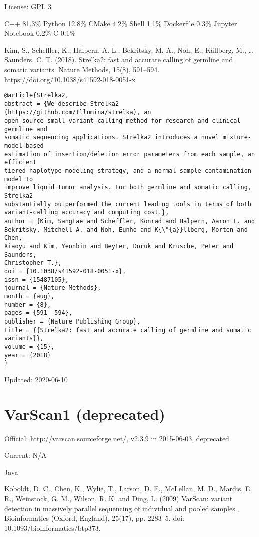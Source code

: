 \documentclass[]{article}
\begin{document}
License: GPL 3

C++ 81.3\% Python 12.8\% CMake 4.2\% Shell 1.1\% Dockerfile 0.3\% Jupyter Notebook 0.2\% C 0.1\%

Kim, S., Scheffler, K., Halpern, A. L., Bekritsky, M. A., Noh, E., Källberg, M., … Saunders, C. T. (2018). Strelka2: fast and accurate calling of germline and somatic variants. Nature Methods, 15(8), 591–594. \url{https://doi.org/10.1038/s41592-018-0051-x}

\begin{verbatim}
@article{Strelka2,
abstract = {We describe Strelka2 (https://github.com/Illumina/strelka), an
open-source small-variant-calling method for research and clinical germline and
somatic sequencing applications. Strelka2 introduces a novel mixture-model-based
estimation of insertion/deletion error parameters from each sample, an efficient
tiered haplotype-modeling strategy, and a normal sample contamination model to
improve liquid tumor analysis. For both germline and somatic calling, Strelka2
substantially outperformed the current leading tools in terms of both
variant-calling accuracy and computing cost.},
author = {Kim, Sangtae and Scheffler, Konrad and Halpern, Aaron L. and
Bekritsky, Mitchell A. and Noh, Eunho and K{\"{a}}llberg, Morten and Chen,
Xiaoyu and Kim, Yeonbin and Beyter, Doruk and Krusche, Peter and Saunders,
Christopher T.},
doi = {10.1038/s41592-018-0051-x},
issn = {15487105},
journal = {Nature Methods},
month = {aug},
number = {8},
pages = {591--594},
publisher = {Nature Publishing Group},
title = {{Strelka2: fast and accurate calling of germline and somatic variants}},
volume = {15},
year = {2018}
}
\end{verbatim}

Updated: 2020-06-10
\section{VarScan1 (deprecated)}

Official: \url{http://varscan.sourceforge.net/}, v2.3.9 in 2015-06-03, deprecated

Current: N/A

Java

Koboldt, D. C., Chen, K., Wylie, T., Larson, D. E., McLellan, M. D., Mardis, E. R., Weinstock, G. M., Wilson, R. K. and Ding, L. (2009) VarScan: variant detection in massively parallel sequencing of individual and pooled samples., Bioinformatics (Oxford, England), 25(17), pp. 2283–5. doi: 10.1093/bioinformatics/btp373.
\end{document}
